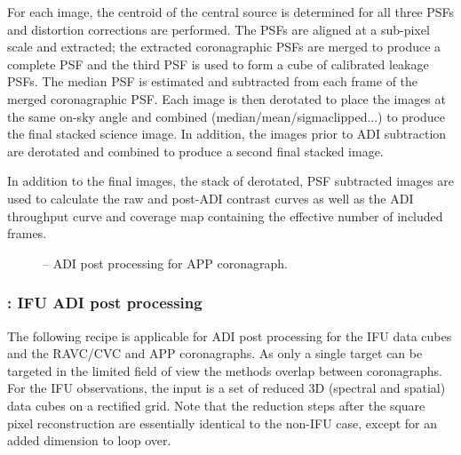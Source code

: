 For each image, the centroid of the central source is determined for
all three PSFs and distortion corrections are performed. The PSFs are
aligned at a sub-pixel scale and extracted; the extracted
coronagraphic PSFs are merged to produce a complete PSF and the third
PSF is used to form a cube of calibrated leakage PSFs.  The
median PSF is estimated and subtracted from each
frame of the merged coronagraphic PSF. Each image is then derotated to
place the images at the same on-sky angle and combined (median/mean/sigmaclipped...) to
produce the final stacked science image. In addition, the images prior
to ADI subtraction are derotated and combined to produce a second
final stacked image.

In addition to the final images, the stack of derotated, PSF
subtracted images are used to calculate the raw and post-ADI contrast
curves as well as the ADI throughput curve and coverage map containing
the effective number of included frames.






\label{rec:metis_lm_adi_app}

\begin{figure}[hb]
  \centering
  \def \globalscale {0.400000}
  \fontsize{10}{12}\selectfont
  
  \caption[Recipe: ]{ -- ADI post processing for APP coronagraph.
    }
  \label{fig:metis_lm_adi_app}
\end{figure}
\restoregeometry

\subsubsection{: IFU ADI post processing}
\label{sssec:adi_ifu}


The following recipe is applicable for ADI post processing for the IFU
data cubes and the RAVC/CVC and APP coronagraphs. As only a single
target can be targeted in the limited field of view the methods
overlap between coronagraphs.  For the IFU observations, the input is
a set of reduced 3D (spectral and spatial) data cubes on a rectified
grid. Note that the reduction steps after the square pixel reconstruction
are essentially identical to the non-IFU case, except for an added dimension
to loop over. 


